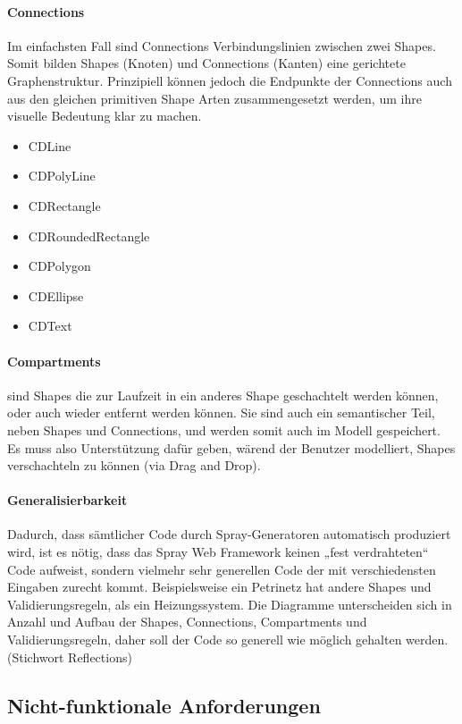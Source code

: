 \paragraph{Connections}

Im einfachsten Fall sind Connections Verbindungslinien zwischen
zwei Shapes. Somit bilden Shapes (Knoten) und Connections (Kanten)
eine gerichtete Graphenstruktur.
Prinzipiell können jedoch die Endpunkte der Connections auch aus den gleichen
primitiven Shape Arten zusammengesetzt werden, um ihre visuelle Bedeutung
klar zu machen.

\begin{itemize}
  \item CDLine
  \item CDPolyLine
  \item CDRectangle
  \item CDRoundedRectangle
  \item CDPolygon
  \item CDEllipse
  \item CDText
\end{itemize}

\paragraph{Compartments}
sind Shapes die zur Laufzeit in ein anderes Shape geschachtelt werden können,
oder auch wieder entfernt werden können. Sie sind auch ein semantischer Teil,
neben Shapes und Connections, und werden somit auch im Modell gespeichert.
Es muss also Unterstützung dafür geben, wärend der Benutzer modelliert, Shapes
verschachteln zu können (via Drag and Drop).


\paragraph{Generalisierbarkeit}
Dadurch, dass sämtlicher Code durch Spray-Generatoren automatisch produziert wird,
ist es nötig, dass das Spray Web Framework keinen „fest verdrahteten“ Code
aufweist, sondern vielmehr sehr generellen Code der mit verschiedensten
Eingaben zurecht kommt.
Beispielsweise ein Petrinetz hat andere Shapes und Validierungsregeln,
als ein Heizungssystem. Die Diagramme unterscheiden sich in Anzahl und
Aufbau der Shapes, Connections, Compartments und Validierungsregeln,
daher soll der Code so generell wie möglich gehalten werden.
(Stichwort Reflections)

\subsection{Nicht-funktionale Anforderungen}

